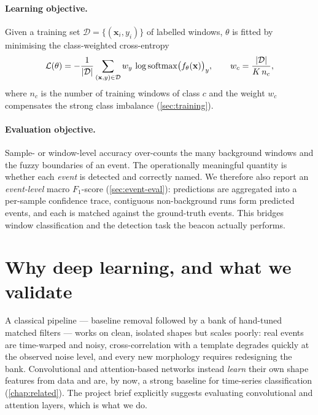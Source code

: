 \paragraph{Learning objective.} Given a training set
$\mathcal{D}=\{(\mathbf{x}_i,y_i)\}$ of labelled windows, $\theta$ is fitted by
minimising the class-weighted cross-entropy
\begin{equation}
    \mathcal{L}(\theta)
    = -\frac{1}{|\mathcal{D}|}\sum_{(\mathbf{x},y)\in\mathcal{D}}
        w_y \,\log \operatorname{softmax}\!\big(f_\theta(\mathbf{x})\big)_y ,
    \qquad
    w_c = \frac{|\mathcal{D}|}{K\,n_c},
    \label{eq:objective}
\end{equation}
where $n_c$ is the number of training windows of class $c$ and the weight $w_c$
compensates the strong class imbalance (\cref{sec:training}).

\paragraph{Evaluation objective.} Sample- or window-level accuracy over-counts
the many background windows and the fuzzy boundaries of an event. The
operationally meaningful quantity is whether each \emph{event} is detected and
correctly named. We therefore also report an \emph{event-level} macro
$F_1$-score (\cref{sec:event-eval}): predictions are aggregated into a per-sample
confidence trace, contiguous non-background runs form predicted events, and each
is matched against the ground-truth events. This bridges window classification
and the detection task the beacon actually performs.

\section{Why deep learning, and what we validate}
\label{sec:why-dl}

A classical pipeline --- baseline removal followed by a bank of hand-tuned
matched filters --- works on clean, isolated shapes but scales poorly: real
events are time-warped and noisy, cross-correlation with a template degrades
quickly at the observed noise level, and every new morphology requires
redesigning the bank. Convolutional and attention-based networks instead
\emph{learn} their own shape features from data and are, by now, a strong
baseline for time-series classification (\cref{chap:related}). The project brief
\cite{centralesupelec_projet} explicitly suggests evaluating convolutional and
attention layers, which is what we do.

